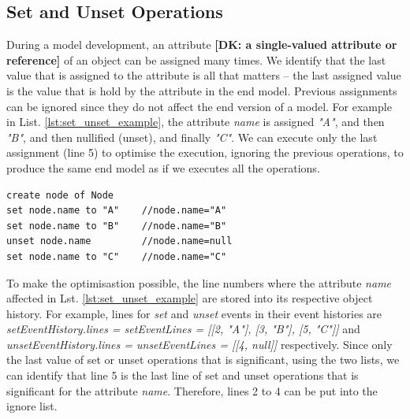 \documentclass[sigconf]{acmart}
\newcommand{\dk}[1]{\textbf{[DK: #1]}}
\begin{document}
\subsection{Set and Unset Operations}
\label{subsec:set_and_unset_operations}
During a model development, an attribute \dk{a single-valued attribute or reference} of an object can be assigned many times. We identify that the last value that is assigned to the attribute is all that matters -- the last assigned value is the value that is hold by the attribute in the end model. Previous assignments can be ignored since they do not affect the end version of a model. For example in List. \ref{lst:set_unset_example}, the attribute \emph{name} is assigned \emph{"A"}, and then \emph{"B"}, and then nullified (unset), and finally \emph{"C"}. We can execute only the last assignment (line 5) to optimise the execution, ignoring the previous operations, to produce the same end model as if we executes all the operations. 

\begin{lstlisting}[style=eol,caption={Example of CBP representation of \emph{name} attribute assignments.},label=lst:set_unset_example]
create node of Node
set node.name to "A"    //node.name="A"    
set node.name to "B"    //node.name="B"
unset node.name         //node.name=null
set node.name to "C"    //node.name="C"
\end{lstlisting}

To make the optimisastion possible, the line numbers where the attribute \emph{name} affected in Lst. \ref{lst:set_unset_example} are stored into its respective object history.  For example, lines for \emph{set} and \emph{unset} events in their event histories are \emph{setEventHistory.lines = setEventLines = [[2, "A"], [3, "B"], [5, "C"]]} and \emph{unsetEventHistory.lines = unsetEventLines = [[4, null]]} respectively. Since only the last value of set or unset operations that is significant, using the two lists, we can identify that line 5 is the last line of set and unset operations that is significant for the attribute \emph{name}. Therefore, lines 2 to 4 can be put into the ignore list.  
\end{document}
